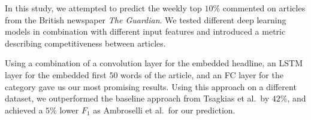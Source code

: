 In this study, we attempted to predict the weekly top $10\%$ commented on articles from the British newspaper \textit{The Guardian}. 
We tested different deep learning models in combination with different input features and introduced a metric describing competitiveness between articles.

Using a combination of a convolution layer for the embedded headline, an LSTM layer for the embedded first $50$ words of the article, and an FC layer for the category gave us our most promising results.
Using this approach on a different dataset, we outperformed the baseline approach from Tsagkias et al.\ by $42\%$, and achieved a $5\%$ lower $F_1$ as Ambroselli et al.\ for our prediction.